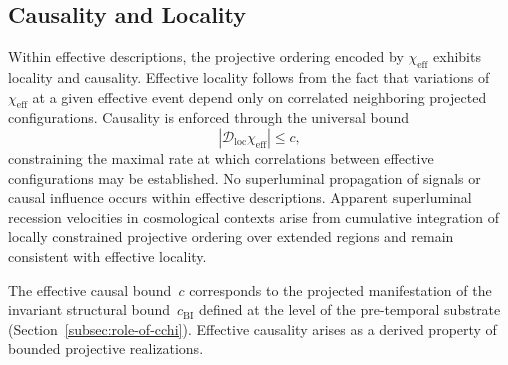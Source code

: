 \subsection{Causality and Locality}
  \label{subsec:causality-and-locality}

  Within effective descriptions, the projective ordering encoded by
  $\chi_{\mathrm{eff}}$ exhibits locality and causality.
  Effective locality follows from the fact that variations of
  $\chi_{\mathrm{eff}}$ at a given effective event depend only on correlated
  neighboring projected configurations.
  Causality is enforced through the universal bound
  \[
    \left| \mathcal{D}_{\mathrm{loc}} \chi_{\mathrm{eff}} \right| \le c ,
  \]
  constraining the maximal rate at which correlations between effective
  configurations may be established.
  No superluminal propagation of signals or causal influence occurs within
  effective descriptions.
  Apparent superluminal recession velocities in cosmological contexts arise
  from cumulative integration of locally constrained projective ordering over
  extended regions and remain consistent with effective locality.

  The effective causal bound~$c$ corresponds to the projected manifestation
  of the invariant structural bound~$c_{\mathrm{BI}}$ defined at the level of the
  pre-temporal substrate
  (Section~\ref{subsec:role-of-cchi}).
  Effective causality arises as a derived property of bounded projective
  realizations.
